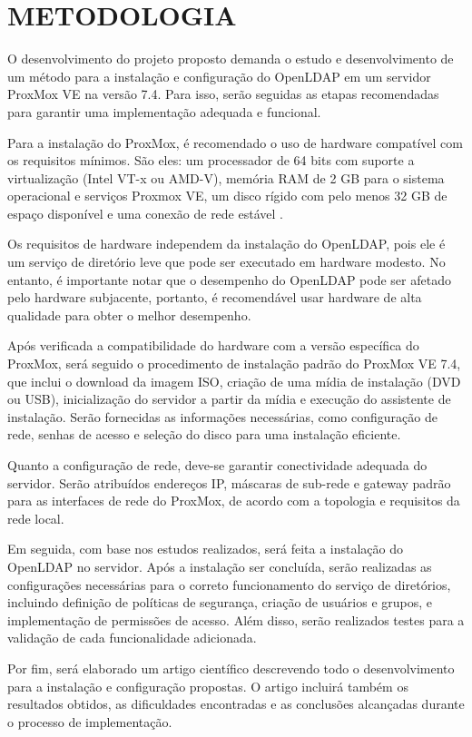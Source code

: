 \newpage

\section{METODOLOGIA}
\label{sec:metodologia}
O desenvolvimento do projeto proposto demanda o estudo e desenvolvimento de um método para a instalação e configuração do OpenLDAP em um servidor ProxMox VE na versão 7.4.  Para isso, serão seguidas as etapas recomendadas para garantir uma implementação adequada e funcional.

Para a instalação do ProxMox, é recomendado o uso de hardware compatível com os requisitos mínimos. São eles: um processador de 64 bits com suporte a virtualização (Intel VT-x ou AMD-V), memória RAM de 2 GB para o sistema operacional e serviços Proxmox VE, um disco rígido com pelo menos 32 GB de espaço disponível e uma conexão de rede estável \cite{proxmox-requirements}.

Os requisitos de hardware independem da instalação do OpenLDAP, pois ele é um serviço de diretório leve que pode ser executado em hardware modesto. No entanto, é importante notar que o desempenho do OpenLDAP pode ser afetado pelo hardware subjacente, portanto, é recomendável usar hardware de alta qualidade para obter o melhor desempenho.

Após verificada a compatibilidade do hardware com a versão específica do ProxMox, será seguido o procedimento de instalação padrão do ProxMox VE 7.4, que inclui o download da imagem ISO, criação de uma mídia de instalação (DVD ou USB), inicialização do servidor a partir da mídia e execução do assistente de instalação. Serão fornecidas as informações necessárias, como configuração de rede, senhas de acesso e seleção do disco para uma instalação eficiente.

Quanto a configuração de rede, deve-se garantir conectividade adequada do servidor. Serão atribuídos endereços IP, máscaras de sub-rede e gateway padrão para as interfaces de rede do ProxMox, de acordo com a topologia e requisitos da rede local.

Em seguida, com base nos estudos realizados, será feita a instalação do OpenLDAP no servidor. Após a instalação ser concluída, serão realizadas as configurações necessárias para o correto funcionamento do serviço de diretórios, incluindo definição de políticas de segurança, criação de usuários e grupos, e implementação de permissões de acesso. Além disso, serão realizados testes para a validação de cada funcionalidade adicionada.

Por fim, será elaborado um artigo científico descrevendo todo o desenvolvimento para a instalação e configuração propostas. O artigo incluirá também os resultados obtidos, as dificuldades encontradas e as conclusões alcançadas durante o processo de implementação.
